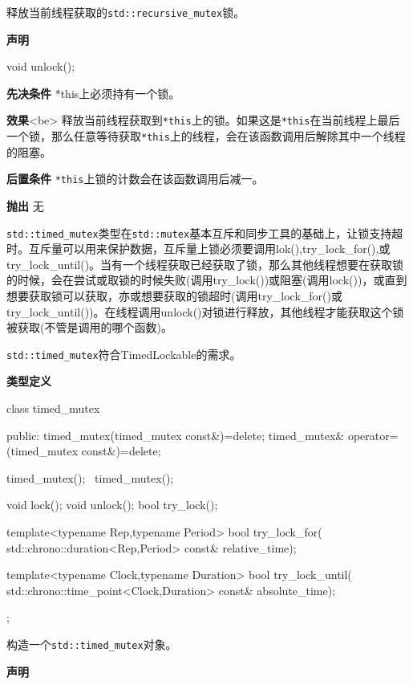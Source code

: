 
释放当前线程获取的\texttt{std::recursive\_mutex}锁。

\textbf{声明}

\begin{cpp}
void unlock();
\end{cpp}

\textbf{先决条件}
*this上必须持有一个锁。

\textbf{效果}<be>
释放当前线程获取到\texttt{*this}上的锁。如果这是\texttt{*this}在当前线程上最后一个锁，那么任意等待获取\texttt{*this}上的线程，会在该函数调用后解除其中一个线程的阻塞。

\textbf{后置条件}
\texttt{*this}上锁的计数会在该函数调用后减一。

\textbf{抛出}
无


\texttt{std::timed\_mutex}类型在\texttt{std::mutex}基本互斥和同步工具的基础上，让锁支持超时。互斥量可以用来保护数据，互斥量上锁必须要调用lok(),try\_lock\_for(),或try\_lock\_until()。当有一个线程获取已经获取了锁，那么其他线程想要在获取锁的时候，会在尝试或取锁的时候失败(调用try\_lock())或阻塞(调用lock())，或直到想要获取锁可以获取，亦或想要获取的锁超时(调用try\_lock\_for()或try\_lock\_until())。在线程调用unlock()对锁进行释放，其他线程才能获取这个锁被获取(不管是调用的哪个函数)。

\texttt{std::timed\_mutex}符合TimedLockable的需求。

\textbf{类型定义}

\begin{cpp}
class timed_mutex
{
public:
  timed_mutex(timed_mutex const&)=delete;
  timed_mutex& operator=(timed_mutex const&)=delete;

  timed_mutex();
  ~timed_mutex();

  void lock();
  void unlock();
  bool try_lock();

  template<typename Rep,typename Period>
  bool try_lock_for(
      std::chrono::duration<Rep,Period> const& relative_time);

  template<typename Clock,typename Duration>
  bool try_lock_until(
      std::chrono::time_point<Clock,Duration> const& absolute_time);
};
\end{cpp}


构造一个\texttt{std::timed\_mutex}对象。

\textbf{声明}

